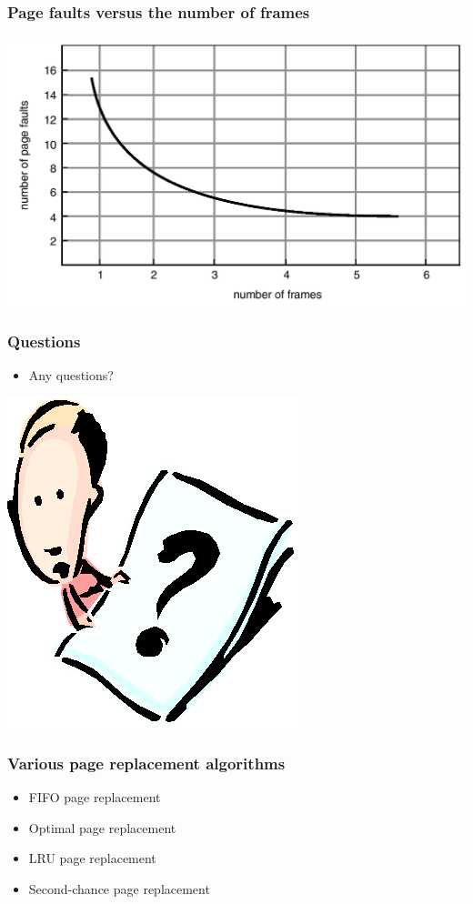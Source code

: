 \documentclass[CJKutf8,xcolor=pdftex,dvipsnames,table]{beamer}
\begin{document}
\begin{CJK*}{UTF8}{song}
  \begin{frame}
    \frametitle{Page faults versus the number of frames} \pause
    \begin{center}
      \includegraphics[scale=0.4]{v6f10-8}
    \end{center}
  \end{frame}
  
  \begin{frame}
    \frametitle{Questions}
    \begin{itemize}
    \item{Any questions?}
    \end{itemize}
    \begin{center}
      \includegraphics[scale=.5]{question}
    \end{center}
  \end{frame}
  
  \begin{frame}
    \frametitle{Various page replacement algorithms} \pause
    \begin{itemize}
    \item{FIFO page replacement} \pause
    \item{Optimal page replacement} \pause
    \item{LRU page replacement} \pause
    \item{Second-chance page replacement}
    \end{itemize}
  \end{frame}
  

\end{CJK*}
\end{document}
